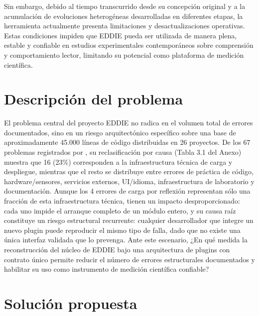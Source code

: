 Sin embargo, debido al tiempo transcurrido desde su concepción original y a la acumulación de evoluciones heterogéneas desarrolladas en diferentes etapas, la herramienta actualmente presenta limitaciones y desactualizaciones operativas. Estas condiciones impiden que EDDIE pueda ser utilizada de manera plena, estable y confiable en estudios experimentales contemporáneos sobre comprensión y comportamiento lector, limitando su potencial como plataforma de medición científica.

\section{Descripci\'on del problema}
\label{intro:problema}
El problema central del proyecto EDDIE no radica en el volumen total de errores documentados, sino en un riesgo arquitectónico específico sobre una base de aproximadamente 45.000 líneas de código distribuidas en 26 proyectos. De los 67 problemas registrados por \cite{ibaceta2023evaluacion}, su reclasificación por causa (Tabla 3.1 del Anexo) muestra que 16 (23\%) corresponden a la infraestructura técnica de carga y despliegue, mientras que el resto se distribuye entre errores de práctica de código, hardware/sensores, servicios externos, UI/idioma, infraestructura de laboratorio y documentación. Aunque los 4 errores de carga por reflexión representan sólo una fracción de esta infraestructura técnica, tienen un impacto desproporcionado: cada uno impide el arranque completo de un módulo entero, y su causa raíz constituye un riesgo estructural recurrente: cualquier desarrollador que integre un nuevo plugin puede reproducir el mismo tipo de falla, dado que no existe una única interfaz validada que lo prevenga. Ante este escenario, ¿En qué medida la reconstrucción del núcleo de EDDIE bajo una arquitectura de plugins con contrato único permite reducir el número de errores estructurales documentados y habilitar su uso como
instrumento de medición científica confiable?


\section{Soluci\'on propuesta}
\label{intro:solucion}


